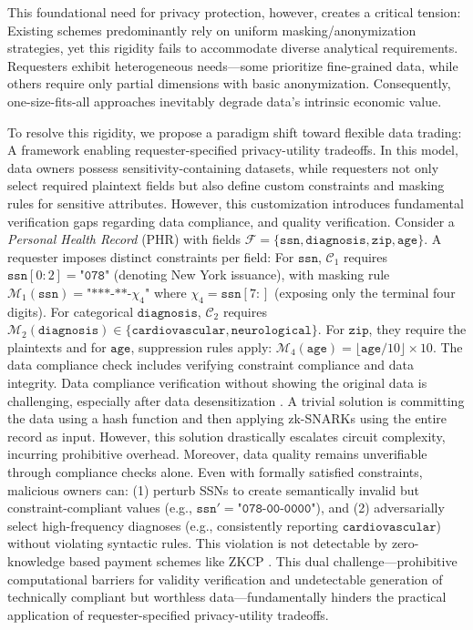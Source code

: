 \documentclass[journal]{IEEEtran}
\begin{document}
This foundational need for privacy protection, however, creates a critical tension: Existing schemes predominantly rely on uniform masking/anonymization strategies\cite{zhang2024privacyasst}, yet this rigidity fails to accommodate diverse analytical requirements. Requesters exhibit heterogeneous needs—some prioritize fine-grained data, while others require only partial dimensions with basic anonymization. Consequently, one-size-fits-all approaches inevitably degrade data's intrinsic economic value.

To resolve this rigidity, we propose a paradigm shift toward flexible data trading: A framework enabling requester-specified privacy-utility tradeoffs. In this model, data owners possess sensitivity-containing datasets, while requesters not only select required plaintext fields but also define custom constraints and masking rules for sensitive attributes.  However, this customization introduces fundamental verification gaps regarding data compliance, and quality verification. Consider a \textit{Personal Health Record} (PHR) with fields $\mathcal{F} = \{\texttt{ssn}, \texttt{diagnosis}, \texttt{zip}, \texttt{age}\}$. A requester imposes distinct constraints per field: For $\texttt{ssn}$, $\mathcal{C}_1$ requires $\texttt{ssn}[0{:}2] = \texttt{"078"}$ (denoting New York issuance), with masking rule $\mathcal{M}_1(\texttt{ssn}) = \texttt{"***-**-}\chi_4\texttt{"}$ where $\chi_4 = \texttt{ssn}[7{:}]$ (exposing only the terminal four digits). For categorical $\texttt{diagnosis}$, $\mathcal{C}_2$ requires $\mathcal{M}_2(\texttt{diagnosis}) \in \{\texttt{cardiovascular}, \texttt{neurological}\}$. For $\texttt{zip}$, they require the plaintexts and  for $\texttt{age}$, suppression rules apply:  $\mathcal{M}_4(\texttt{age}) = \lfloor \texttt{age}/10 \rfloor \times 10$. The data compliance check includes verifying constraint compliance and data integrity. Data compliance verification without showing the original data is challenging, especially after data desensitization \cite{yamac2020multi, hong2023location}. A trivial solution is committing the data using a hash function and then applying zk-SNARKs using the entire record as input. However, this solution drastically escalates circuit complexity, incurring prohibitive overhead. Moreover, data quality remains unverifiable through compliance checks alone. Even with formally satisfied constraints, malicious owners can: (1) perturb SSNs to create semantically invalid but constraint-compliant values (e.g., $\texttt{ssn}' = \texttt{"078-00-0000"}$), and (2) adversarially select high-frequency diagnoses (e.g., consistently reporting $\texttt{cardiovascular}$) without violating syntactic rules. This violation is not detectable by zero-knowledge based payment schemes like ZKCP \cite{campanelli2017zero}. This dual challenge—prohibitive computational barriers for validity verification and undetectable generation of technically compliant but worthless data—fundamentally hinders the practical application of requester-specified privacy-utility tradeoffs.
\end{document}
